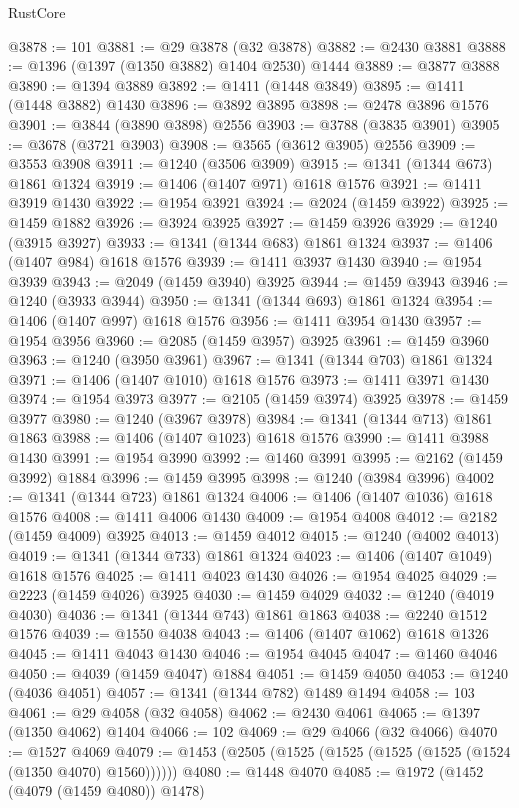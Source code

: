 \begin{lexlean}{RustCore}
\begin{coremodule}
{\begin{coremodule}
{{{{{{{{{{{{{{{{{{{{{{{{{{{{{{{{{{{{{{{{{{{{{@3878 := 101
@3881 := @29 @3878 (@32 @3878)
@3882 := @2430 @3881
@3888 := @1396 (@1397 (@1350 @3882) @1404 @2530) @1444
@3889 := @3877 @3888
@3890 := @1394 @3889
@3892 := @1411 (@1448 @3849)
@3895 := @1411 (@1448 @3882) @1430
@3896 := @3892 @3895
@3898 := @2478 @3896 @1576
@3901 := @3844 (@3890 @3898) @2556
@3903 := @3788 (@3835 @3901)
@3905 := @3678 (@3721 @3903)
@3908 := @3565 (@3612 @3905) @2556
@3909 := @3553 @3908
@3911 := @1240 (@3506 @3909)
@3915 := @1341 (@1344 @673) @1861 @1324
@3919 := @1406 (@1407 @971) @1618 @1576
@3921 := @1411 @3919 @1430
@3922 := @1954 @3921
@3924 := @2024 (@1459 @3922)
@3925 := @1459 @1882
@3926 := @3924 @3925
@3927 := @1459 @3926
@3929 := @1240 (@3915 @3927)
@3933 := @1341 (@1344 @683) @1861 @1324
@3937 := @1406 (@1407 @984) @1618 @1576
@3939 := @1411 @3937 @1430
@3940 := @1954 @3939
@3943 := @2049 (@1459 @3940) @3925
@3944 := @1459 @3943
@3946 := @1240 (@3933 @3944)
@3950 := @1341 (@1344 @693) @1861 @1324
@3954 := @1406 (@1407 @997) @1618 @1576
@3956 := @1411 @3954 @1430
@3957 := @1954 @3956
@3960 := @2085 (@1459 @3957) @3925
@3961 := @1459 @3960
@3963 := @1240 (@3950 @3961)
@3967 := @1341 (@1344 @703) @1861 @1324
@3971 := @1406 (@1407 @1010) @1618 @1576
@3973 := @1411 @3971 @1430
@3974 := @1954 @3973
@3977 := @2105 (@1459 @3974) @3925
@3978 := @1459 @3977
@3980 := @1240 (@3967 @3978)
@3984 := @1341 (@1344 @713) @1861 @1863
@3988 := @1406 (@1407 @1023) @1618 @1576
@3990 := @1411 @3988 @1430
@3991 := @1954 @3990
@3992 := @1460 @3991
@3995 := @2162 (@1459 @3992) @1884
@3996 := @1459 @3995
@3998 := @1240 (@3984 @3996)
@4002 := @1341 (@1344 @723) @1861 @1324
@4006 := @1406 (@1407 @1036) @1618 @1576
@4008 := @1411 @4006 @1430
@4009 := @1954 @4008
@4012 := @2182 (@1459 @4009) @3925
@4013 := @1459 @4012
@4015 := @1240 (@4002 @4013)
@4019 := @1341 (@1344 @733) @1861 @1324
@4023 := @1406 (@1407 @1049) @1618 @1576
@4025 := @1411 @4023 @1430
@4026 := @1954 @4025
@4029 := @2223 (@1459 @4026) @3925
@4030 := @1459 @4029
@4032 := @1240 (@4019 @4030)
@4036 := @1341 (@1344 @743) @1861 @1863
@4038 := @2240 @1512 @1576
@4039 := @1550 @4038
@4043 := @1406 (@1407 @1062) @1618 @1326
@4045 := @1411 @4043 @1430
@4046 := @1954 @4045
@4047 := @1460 @4046
@4050 := @4039 (@1459 @4047) @1884
@4051 := @1459 @4050
@4053 := @1240 (@4036 @4051)
@4057 := @1341 (@1344 @782) @1489 @1494
@4058 := 103
@4061 := @29 @4058 (@32 @4058)
@4062 := @2430 @4061
@4065 := @1397 (@1350 @4062) @1404
@4066 := 102
@4069 := @29 @4066 (@32 @4066)
@4070 := @1527 @4069
@4079 := @1453 (@2505 (@1525 (@1525 (@1525 (@1525 (@1524 (@1350 @4070) @1560))))))
@4080 := @1448 @4070
@4085 := @1972 (@1452 (@4079 (@1459 @4080)) @1478)
}}}}}}}}}}}}}}}}}}}}}}}}}}}}}}}}}}}}}}}}}}}}}
\end{coremodule}}
\end{coremodule}
\end{lexlean}
